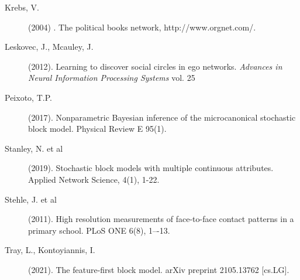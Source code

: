 
\begin{description}
	
	\item[Krebs, V.] (2004) . The political books network,
	http://www.orgnet.com/.

	\item[Leskovec, J., Mcauley, J.] (2012).
	Learning to discover social circles in ego networks.
	{\it Advances in Neural Information Processing Systems} vol. 25

	\item[Peixoto, T.P.] (2017).
	Nonparametric Bayesian inference of the microcanonical
	stochastic block model. Physical Review E 95(1).

	\item[Stanley, N. et al] (2019). Stochastic block models with multiple continuous attributes. Applied Network Science, 4(1), 1-22.

	\item[Stehle, J. et al] (2011).
	High resolution measurements of face-to-face contact patterns in a primary school.
	PLoS ONE 6(8), 1–-13.

	\item[Tray, L., Kontoyiannis, I.] (2021).
	The feature-first block model.
	arXiv preprint 2105.13762 [cs.LG].

\end{description}
